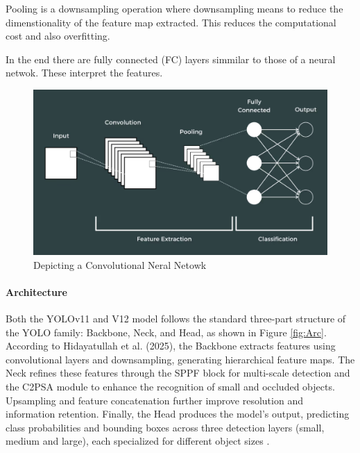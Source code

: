\documentclass[a4paper,10pt,twocolumn]{article}
\numberwithin{figure}{section}
\numberwithin{table}{section}
\begin{document}
Pooling is a downsampling operation where downsampling means to reduce 
the dimenstionality of the feature map extracted. 
This reduces the computational cost and also overfitting.

In the end there are fully connected (FC) layers simmilar to those of a 
neural netwok. These interpret the features.


\begin{figure}[h]
    \centering
    \includegraphics[width=1\linewidth]{CNN.png}  %
    \caption{Depicting a Convolutional Neral Netowk}
    \label{fig:CNN}  
\end{figure}


\paragraph{Architecture}

Both the YOLOv11 and V12 model follows the standard three-part structure of the YOLO family: 
Backbone, Neck, and Head, as shown in Figure \ref{fig:Arc}.
According to Hidayatullah et al. (2025), the Backbone extracts features using 
convolutional layers and downsampling, generating hierarchical feature maps.
The Neck refines these features through the SPPF block for multi-scale detection 
and the C2PSA module to enhance the recognition of small and occluded objects. 
Upsampling and feature concatenation further improve resolution and information 
retention. Finally, the Head produces the model’s output, predicting class probabilities 
and bounding boxes across three detection layers (small, medium and large), 
each specialized for different object sizes \citep{hidayatullah2025yolov8yolo11comprehensivearchitecture}.
\vspace{0.3cm}
\end{document}
